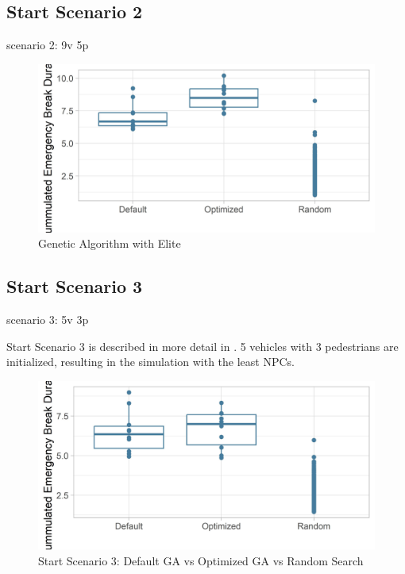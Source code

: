 \subsection{Start Scenario 2}
scenario 2: 9v 5p
\begin{figure}[ht] 
	\label{figure:sim_2_comparison}
	\includegraphics[width=1\linewidth]{simulations/evaluation/plots/sim_1_comparison}
	\caption{Genetic Algorithm with Elite}
\end{figure}


\subsection{Start Scenario 3}
scenario 3: 5v 3p

Start Scenario 3 is described in more detail in . 5 vehicles with 3 pedestrians are initialized, resulting in the simulation with the least NPCs.








\begin{figure}[ht] 
	\label{figure:sim_3_comparison}
	\includegraphics[width=1\linewidth]{simulations/evaluation/plots/sim_3_comparison}
	\caption{Start Scenario 3: Default GA vs Optimized GA vs Random Search}
\end{figure}

